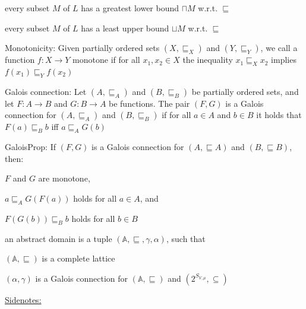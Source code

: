 \documentclass[landscape, a4paper]{article}
\begin{document}
\begin{minipage}[t]{0.2\linewidth}
\begin{betterlist}
\begin{betterlist}
			\item every subset $M$ of $L$ has a \alert{greatest lower bound} $\sqcap M$ w.r.t. $\sqsubseteq$
			\item every subset $M$ of $L$ has a \alert{least upper bound} $\sqcup M$ w.r.t. $\sqsubseteq$
			\item {}
		\end{betterlist}
		\item \alert{Monotonicity:} Given partially ordered sets $(X, \sqsubseteq_X)$ and $(Y, \sqsubseteq_Y)$, we call a function $f:X\rightarrow Y$ \alert{monotone} if for all $x_1, x_2 \in X$ the inequality $x_1 \sqsubseteq_X x_2$ implies $f(x_1) \sqsubseteq_Y f(x_2)$
		\begin{betterlist}
			\item {}
		\end{betterlist}
  \item \color{orange}\alert{Galois connection:} Let $(A, \sqsubseteq_A)$ and $(B, \sqsubseteq_B)$ be partially ordered sets, and let $F : A \rightarrow B$ and $G : B \rightarrow A$ be functions. The pair $(F, G)$ is a Galois connection for $(A, \sqsubseteq_A)$ and $(B, \sqsubseteq_B)$ if for all $a \in A$ and $b \in B$ it holds that $F(a) \sqsubseteq_B b$ iff $a \sqsubseteq_A G(b)$\color{black}
  \item \color{orange}\alert{GaloisProp:} If $(F, G)$ is a \alert{Galois connection} for $(A, \sqsubseteq A)$ and $(B, \sqsubseteq B)$, then:
		\begin{betterlist}
			\item $F$ and $G$ are \alert{monotone},
			\item $a \sqsubseteq_A G(F(a))$ holds for all $a \in A$, and
			\item $F(G(b)) \sqsubseteq_B b$ holds for all $b \in B$
			\item \script{394}{Proof}
      \end{betterlist}\color{black}
    \item \color{orange}an \alert{abstract domain} is a tuple $(\mathbb{A}, \sqsubseteq, \gamma, \alpha)$, such that
		\begin{betterlist}
			\item $(\mathbb{A}, \sqsubseteq)$ is a complete lattice
			\item $(\alpha, \gamma)$ is a Galois connection for $(\mathbb{A}, \sqsubseteq)$ and $(2^{S_{V ,\mu}}, \subseteq)$
			\item \underline{Sidenotes:}
			\begin{betterlist}

\end{betterlist}
\end{betterlist}
\end{betterlist}
\end{minipage}
\end{document}

